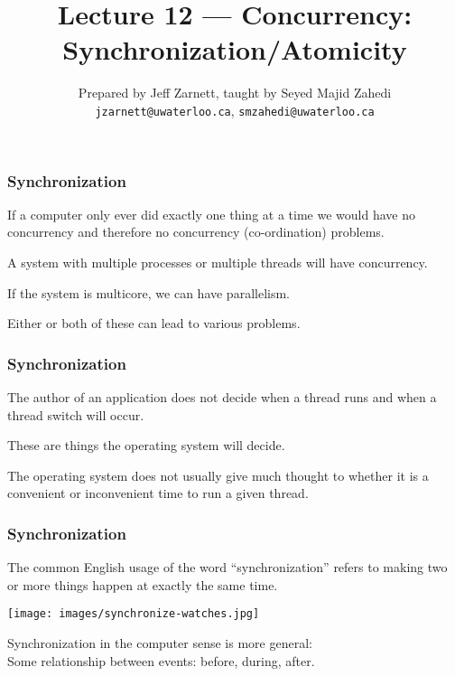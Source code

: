 

\title{Lecture 12 --- Concurrency: Synchronization/Atomicity }

\author{Prepared by Jeff Zarnett, taught by Seyed Majid Zahedi \\ \small \texttt{jzarnett@uwaterloo.ca}, \texttt{smzahedi@uwaterloo.ca}}
\date{}




\begin{frame}
	\titlepage

\end{frame}


\begin{frame}
	\frametitle{Synchronization}

	If a computer only ever did exactly one thing at a time we would have no concurrency and therefore no concurrency (co-ordination) problems.

	A system with multiple processes or multiple threads will have concurrency.

	If the system is multicore, we can have parallelism.

	Either or both of these can lead to various problems.


\end{frame}

\begin{frame}
	\frametitle{Synchronization}

	The author of an application does not decide when a thread runs and when a thread switch will occur.

	These are things the operating system will decide.

	The operating system does not usually give much thought to whether it is a convenient or inconvenient time to run a given thread.


\end{frame}

\begin{frame}
	\frametitle{Synchronization}

	The common English usage of the word ``synchronization'' refers to making two or more things happen at exactly the same time.

	\begin{center}
		\texttt{[image: images/synchronize-watches.jpg]}
	\end{center}

	Synchronization in the computer sense is more general:\\
	\quad Some relationship between events: before, during, after.

\end{frame}


